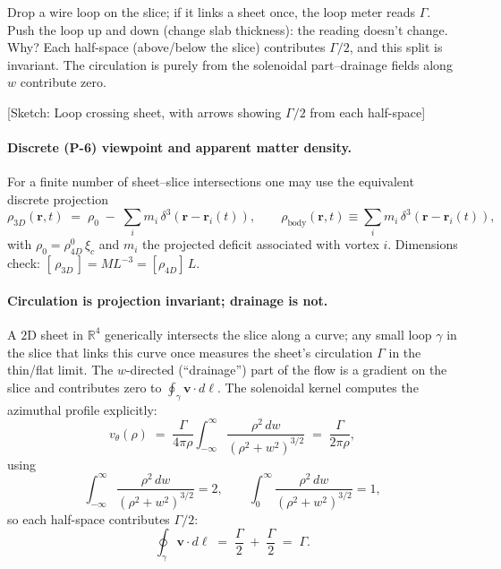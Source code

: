 \begin{tcolorbox}[title=Thought experiment: Loop meter reading\label{box:loop-meter},colback=gray!5,colframe=gray!35!black]
Drop a wire loop on the slice; if it links a sheet once, the loop meter reads $\Gamma$. Push the loop up and down (change slab thickness): the reading doesn't change. Why? Each half-space (above/below the slice) contributes $\Gamma/2$, and this split is invariant. The circulation is purely from the solenoidal part--drainage fields along $w$ contribute zero.

\begin{center}
[Sketch: Loop crossing sheet, with arrows showing $\Gamma/2$ from each half-space]
\end{center}
\end{tcolorbox}

\paragraph{Discrete (P-6) viewpoint and apparent matter density.}
For a finite number of sheet–slice intersections one may use the equivalent discrete projection
\begin{equation}
  \rho_{3D}(\mathbf r,t)
  \;=\;
  \rho_0 \;-\; \sum_i m_i\,\delta^3(\mathbf r-\mathbf r_i(t)),
  \qquad
  \rho_{\text{body}}(\mathbf r,t)\equiv \sum_i m_i\,\delta^3(\mathbf r-\mathbf r_i(t)),
  \label{eq:rho3D_discrete}
\end{equation}
with $\rho_0=\rho_{4D}^0\,\xi_c$ and $m_i$ the projected deficit associated with vortex $i$. Dimensions check: $[\,\rho_{3D}\,]=ML^{-3}= [\rho_{4D}]\,L$.

\paragraph{Circulation is projection invariant; drainage is not.}
A $2$D sheet in $\mathbb R^4$ generically intersects the slice along a curve; any small loop $\gamma$ in the slice that links this curve once measures the sheet's circulation $\Gamma$ in the thin/flat limit. The $w$-directed (“drainage”) part of the flow is a gradient on the slice and contributes zero to $\oint_\gamma \mathbf v\cdot d\boldsymbol\ell$. The solenoidal kernel computes the azimuthal profile explicitly:
\begin{equation}
  v_\theta(\rho)
  \;=\; \frac{\Gamma}{4\pi\rho}\int_{-\infty}^{\infty}
  \frac{\rho^2\,dw}{(\rho^2+w^2)^{3/2}}
  \;=\; \frac{\Gamma}{2\pi\rho},
  \label{eq:vtheta_kernel}
\end{equation}
using
\begin{equation}
  \int_{-\infty}^{\infty} \frac{\rho^2\,dw}{(\rho^2+w^2)^{3/2}}=2,
  \qquad
  \int_{0}^{\infty} \frac{\rho^2\,dw}{(\rho^2+w^2)^{3/2}}=1,
  \label{eq:halfspace_integrals}
\end{equation}
so each half-space contributes $\Gamma/2$:
\begin{equation}
  \oint_{\gamma}\mathbf v\cdot d\boldsymbol{\ell}
  \;=\; \frac{\Gamma}{2} \;+\; \frac{\Gamma}{2} \;=\; \Gamma .
  \label{eq:circulation_split}
\end{equation}


